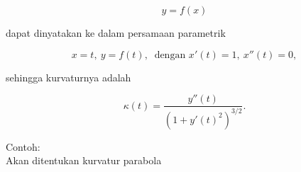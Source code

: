 \documentclass[12pt,arial,letterpaper]{book}
\begin{document}
\begin{eulercomment}
\begin{eulercomment}
\begin{eulercomment}
\begin{eulercomment}
\begin{eulercomment}
\begin{eulercomment}
\begin{eulercomment}
\begin{eulercomment}
\begin{eulercomment}
\begin{eulercomment}
\begin{eulercomment}
\begin{eulercomment}
\begin{eulercomment}
\begin{eulercomment}
\begin{eulercomment}
\begin{eulercomment}
\begin{eulercomment}
\begin{eulercomment}
\begin{eulercomment}
\begin{eulercomment}
\begin{eulercomment}
\begin{eulercomment}
\begin{eulercomment}
\end{eulercomment}
\begin{eulerformula}
\[
y=f(x)
\]
\end{eulerformula}
\begin{eulercomment}
dapat dinyatakan ke dalam persamaan parametrik

\end{eulercomment}
\begin{eulerformula}
\[
x=t,\ y=f(t),\ \text{ dengan } x'(t)=1,\ x''(t)=0,
\]
\end{eulerformula}
\begin{eulercomment}
sehingga kurvaturnya adalah

\end{eulercomment}
\begin{eulerformula}
\[
\kappa(t) = \frac{y''(t)}{\left(1+y'(t)^2\right)^{3/2}}.
\]
\end{eulerformula}
\begin{eulercomment}
Contoh:\\
Akan ditentukan kurvatur parabola


\end{eulercomment}
\end{eulercomment}
\end{eulercomment}
\end{eulercomment}
\end{eulercomment}
\end{eulercomment}
\end{eulercomment}
\end{eulercomment}
\end{eulercomment}
\end{eulercomment}
\end{eulercomment}
\end{eulercomment}
\end{eulercomment}
\end{eulercomment}
\end{eulercomment}
\end{eulercomment}
\end{eulercomment}
\end{eulercomment}
\end{eulercomment}
\end{eulercomment}
\end{eulercomment}
\end{eulercomment}
\end{eulercomment}
\end{document}
